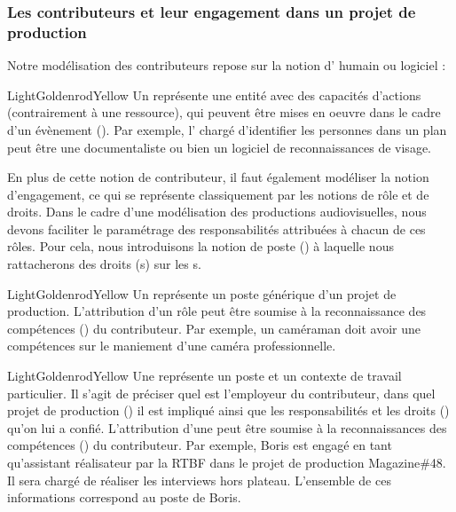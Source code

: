 \subsubsection{Les contributeurs et leur engagement dans un projet de production}
Notre modélisation des contributeurs repose sur la notion d' humain ou logiciel :
\begin{cadrecol}{LightGoldenrodYellow}
Un  représente une entité avec des capacités d'actions (contrairement à une ressource), qui peuvent être mises en oeuvre dans le cadre d'un évènement ().
Par exemple, l' chargé d'identifier les personnes dans un plan peut être une documentaliste ou bien un logiciel de reconnaissances de visage.
\end{cadrecol}

En plus de cette notion de contributeur, il faut également modéliser la notion d'engagement, ce qui se représente classiquement par les notions de rôle et de droits.
Dans le cadre d'une modélisation des productions audiovisuelles, nous devons faciliter le paramétrage des responsabilités attribuées à chacun de ces rôles. 
Pour cela, nous introduisons la notion de poste () à laquelle nous rattacherons des droits (s) sur les s.

\begin{cadrecol}{LightGoldenrodYellow}
Un  représente un poste générique d'un projet de production. 
L'attribution d'un rôle peut être soumise à la reconnaissance des compétences () du contributeur.
Par exemple, un caméraman doit avoir une compétences sur le maniement d'une caméra professionnelle.
\end{cadrecol}

\begin{cadrecol}{LightGoldenrodYellow}
Une  représente un poste et un contexte de travail particulier.
Il s'agit de préciser quel est l'employeur du contributeur, dans quel projet de production () il est impliqué ainsi que les responsabilités et les droits () qu'on lui a confié. 
L'attribution d'une  peut être soumise à la reconnaissances des compétences () du contributeur.
Par exemple, Boris est engagé en tant qu'assistant réalisateur par la RTBF dans le projet de production Magazine\#48.
Il sera chargé de réaliser les interviews hors plateau.
L'ensemble de ces informations correspond au poste de Boris.
\end{cadrecol}

